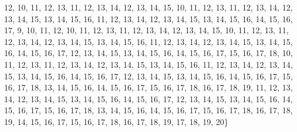 \begin{DoxyCompactItemize}
12, 10, 11, 12, 13, 11, 12, 13, 14, 12, 13, 14, 15, 10, 11, 12, 13, 11, 12, 13, 14, 12, 13, 14, 15, 13, 14, 15, 16, 11, 12, 13, 14, 12, 13, 14, 15, 13, 14, 15, 16, 14, 15, 16, 17, 9, 10, 11, 12, 10, 11, 12, 13, 11, 12, 13, 14, 12, 13, 14, 15, 10, 11, 12, 13, 11, 12, 13, 14, 12, 13, 14, 15, 13, 14, 15, 16, 11, 12, 13, 14, 12, 13, 14, 15, 13, 14, 15, 16, 14, 15, 16, 17, 12, 13, 14, 15, 13, 14, 15, 16, 14, 15, 16, 17, 15, 16, 17, 18, 10, 11, 12, 13, 11, 12, 13, 14, 12, 13, 14, 15, 13, 14, 15, 16, 11, 12, 13, 14, 12, 13, 14, 15, 13, 14, 15, 16, 14, 15, 16, 17, 12, 13, 14, 15, 13, 14, 15, 16, 14, 15, 16, 17, 15, 16, 17, 18, 13, 14, 15, 16, 14, 15, 16, 17, 15, 16, 17, 18, 16, 17, 18, 19, 11, 12, 13, 14, 12, 13, 14, 15, 13, 14, 15, 16, 14, 15, 16, 17, 12, 13, 14, 15, 13, 14, 15, 16, 14, 15, 16, 17, 15, 16, 17, 18, 13, 14, 15, 16, 14, 15, 16, 17, 15, 16, 17, 18, 16, 17, 18, 19, 14, 15, 16, 17, 15, 16, 17, 18, 16, 17, 18, 19, 17, 18, 19, 20\}
\item 

\end{DoxyCompactItemize}
